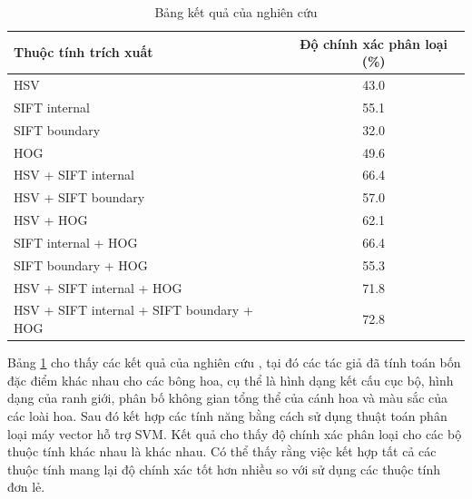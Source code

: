 \documentclass[12pt]{report}
\begin{document}
		\begin{table}[h]
			\centering
			\caption{Bảng kết quả của nghiên cứu \cite{cia-Nilsback08}}
			\label{tbl:table ket qua cua Nilsback08}
			\begin{tabular}{|l|c|}
				\hline
				\textbf{Thuộc tính trích xuất}      & \textbf{Độ chính xác phân loại (\%)} \\ \hline
				HSV                                       & 43.0                                         \\ \hline
				SIFT internal                             & 55.1                                         \\ \hline
				SIFT boundary                             & 32.0                                         \\ \hline
				HOG                                       & 49.6                                         \\ \hline
				HSV + SIFT internal                       & 66.4                                         \\ \hline
				HSV + SIFT boundary                       & 57.0                                         \\ \hline
				HSV + HOG                                 & 62.1                                         \\ \hline
				SIFT internal + HOG                       & 66.4                                         \\ \hline
				SIFT boundary + HOG                       & 55.3                                         \\ \hline
				HSV + SIFT internal + HOG                 & 71.8                                         \\ \hline
				HSV + SIFT internal + SIFT boundary + HOG & 72.8                                         \\ \hline
																																																																																												
			\end{tabular}
		\end{table}
																																																
		Bảng \ref{tbl:table ket qua cua Nilsback08} cho thấy các kết quả của nghiên cứu \cite{cia-Nilsback08}, tại đó các tác giả đã tính toán bốn đặc điểm khác nhau cho các bông hoa, cụ thể là hình dạng kết cấu cục bộ, hình dạng của ranh giới, phân bố không gian tổng thể của cánh hoa và màu sắc của các loài hoa. Sau đó kết hợp các tính năng bằng cách sử dụng thuật toán phân loại máy vector hỗ trợ SVM. Kết quả cho thấy độ chính xác phân loại cho các bộ thuộc tính khác nhau là khác nhau. Có thể thấy rằng việc kết hợp tất cả các thuộc tính mang lại độ chính xác tốt hơn nhiều so với sử dụng các thuộc tính đơn lẻ.
																																								
\end{document}
